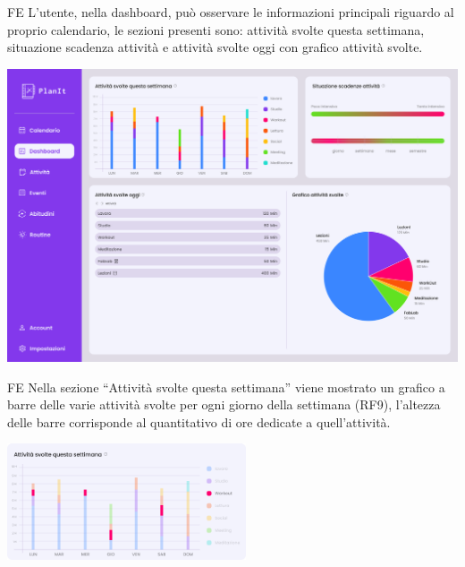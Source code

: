 \begin{listaPersonale}{FE}
     L’utente, nella dashboard, può osservare le informazioni principali riguardo al proprio calendario, le sezioni presenti sono: attività svolte questa settimana, situazione scadenza attività e attività svolte oggi con grafico attività svolte.
    \begin{center}
        \includegraphics[width=1\textwidth]{img/FrontEnd/Dashboard/Dashboard.png}
    \end{center}
    
    \begin{listaPersonale2}{FE}
         Nella sezione “Attività svolte questa settimana” viene mostrato un grafico a barre delle varie attività svolte per ogni giorno della settimana (RF9), l’altezza delle barre corrisponde al quantitativo di ore dedicate a quell’attività.

        \begin{center}
            \includegraphics[width=0.53\textwidth,height=0.18\textheight]{img/FrontEnd/Dashboard/graficoBarre.png} %
        \end{center}
        

\end{listaPersonale2}
\end{listaPersonale}
